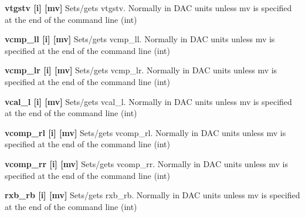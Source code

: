 \begin{DoxyItemize}
\item {\bfseries vtgstv \mbox{[}i\mbox{]} \mbox{[}mv\mbox{]}} Sets/gets vtgstv. Normally in DAC units unless {\ttfamily mv} is specified at the end of the command line (int)
\end{DoxyItemize}


\begin{DoxyItemize}
\item {\bfseries vcmp\_\-ll \mbox{[}i\mbox{]} \mbox{[}mv\mbox{]}} Sets/gets vcmp\_\-ll. Normally in DAC units unless {\ttfamily mv} is specified at the end of the command line (int)
\end{DoxyItemize}


\begin{DoxyItemize}
\item {\bfseries vcmp\_\-lr \mbox{[}i\mbox{]} \mbox{[}mv\mbox{]}} Sets/gets vcmp\_\-lr. Normally in DAC units unless {\ttfamily mv} is specified at the end of the command line (int)
\end{DoxyItemize}


\begin{DoxyItemize}
\item {\bfseries vcal\_\-l \mbox{[}i\mbox{]} \mbox{[}mv\mbox{]}} Sets/gets vcal\_\-l. Normally in DAC units unless {\ttfamily mv} is specified at the end of the command line (int)
\end{DoxyItemize}


\begin{DoxyItemize}
\item {\bfseries vcomp\_\-rl \mbox{[}i\mbox{]} \mbox{[}mv\mbox{]}} Sets/gets vcomp\_\-rl. Normally in DAC units unless {\ttfamily mv} is specified at the end of the command line (int)
\end{DoxyItemize}


\begin{DoxyItemize}
\item {\bfseries vcomp\_\-rr \mbox{[}i\mbox{]} \mbox{[}mv\mbox{]}} Sets/gets vcomp\_\-rr. Normally in DAC units unless {\ttfamily mv} is specified at the end of the command line (int)
\end{DoxyItemize}


\begin{DoxyItemize}
\item {\bfseries rxb\_\-rb \mbox{[}i\mbox{]} \mbox{[}mv\mbox{]}} Sets/gets rxb\_\-rb. Normally in DAC units unless {\ttfamily mv} is specified at the end of the command line (int)
\end{DoxyItemize}


